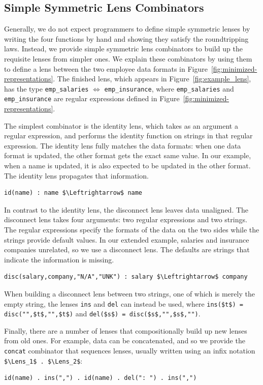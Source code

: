 \documentclass[acmsmall,screen,anonymous]{acmart}
\begin{document}
\subsection{Simple Symmetric Lens Combinators} 
Generally, we do not expect programmers to define simple symmetric lenses by
writing the four functions by hand and showing they satisfy the
roundtripping laws.  Instead, we provide simple symmetric lens
combinators to build up the requisite lenses from simpler ones.
We explain these combinators by using them to define a lens between
the two employee data formats in Figure~\ref{fig:minimized-representations}. 
The finished lens, which appears in Figure~\ref{fig:example_lens}, has
the type 
\lstinline{emp_salaries} $\Leftrightarrow$ \lstinline{emp_insurance}, where
\lstinline{emp_salaries} and \lstinline{emp_insurance} are regular
expressions defined in Figure~\ref{fig:minimized-representations}. 


The simplest combinator is the identity lens, which takes as an argument a
regular expression, and performs the 
identity function on strings in that regular expression. The identity lens fully
matches the data formats: when one data format is updated, the other format gets
the exact same value. In our example, when a name is updated, it is also
expected to be updated in the other format. The identity lens propagates that
information.
%
\begin{lstlisting}
id(name) : name $\Leftrightarrow$ name
\end{lstlisting}
%

In contrast to the identity lens, the disconnect lens leaves data
unaligned. The disconnect lens takes four arguments: two regular 
expressions and two strings. The regular expressions specify the
formats of the data on the two sides while the strings provide default
values.  In our extended example, salaries and
insurance companies unrelated, so we use a disconnect lens.  The
defaults are strings that indicate the information is missing.
%
\begin{lstlisting}
disc(salary,company,"N/A","UNK") : salary $\Leftrightarrow$ company
\end{lstlisting}
%
When building a disconnect lens between two strings, one of which is merely the
empty string, the lenses \lstinline{ins} and \lstinline{del} can instead be
used, where \lstinline{ins($t$) = disc("",$t$,"",$t$)} and
\lstinline{del($s$) = disc($s$,"",$s$,"")}.

Finally, there are a number of lenses that compositionally build up new lenses
from old ones. 
For example, data can be concatenated, and so we provide
the \lstinline{concat} combinator that sequences lenses, usually
written using an infix notation \lstinline{$\Lens_1$ . $\Lens_2$}:
%
\begin{lstlisting}
id(name) . ins(",") . id(name) . del(": ") . ins(",")
\end{lstlisting}
%
\end{document}
